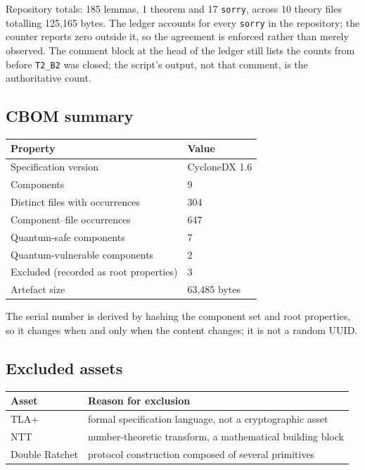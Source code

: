 Repository totals: 185 lemmas, 1 theorem and 17 \texttt{sorry}, across 10 theory
files totalling 125{,}165 bytes. The ledger accounts for every \texttt{sorry}
in the repository; the counter reports zero outside it, so the agreement is
enforced rather than merely observed. The comment block at the head of the
ledger still lists the counts from before \texttt{T2\_B2} was closed; the
script's output, not that comment, is the authoritative count.

\subsection{CBOM summary}

\begin{center}
\begin{tabular}{@{}ll@{}}
\toprule
Property & Value \\
\midrule
Specification version & CycloneDX 1.6 \\
Components & 9 \\
Distinct files with occurrences & 304 \\
Component--file occurrences & 647 \\
Quantum-safe components & 7 \\
Quantum-vulnerable components & 2 \\
Excluded (recorded as root properties) & 3 \\
Artefact size & 63{,}485 bytes \\
\bottomrule
\end{tabular}
\end{center}

The serial number is derived by hashing the component set and root properties,
so it changes when and only when the content changes; it is not a random UUID.

\subsection{Excluded assets}

\begin{center}
\begin{tabular}{@{}ll@{}}
\toprule
Asset & Reason for exclusion \\
\midrule
TLA+ & formal specification language, not a cryptographic asset \\
NTT & number-theoretic transform, a mathematical building block \\
Double Ratchet & protocol construction composed of several primitives \\
\bottomrule
\end{tabular}
\end{center}
